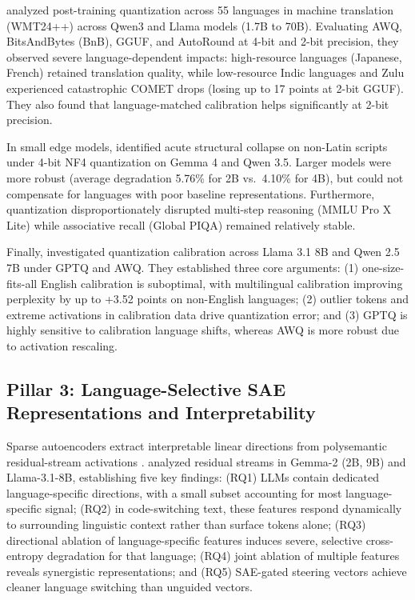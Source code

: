 \documentclass[11pt]{article}
\begin{document}
\citet{marie2025uneven} analyzed post-training quantization across 55 languages in machine translation (WMT24++) across Qwen3 and Llama models (1.7B to 70B). Evaluating AWQ, BitsAndBytes (BnB), GGUF, and AutoRound at 4-bit and 2-bit precision, they observed severe language-dependent impacts: high-resource languages (Japanese, French) retained translation quality, while low-resource Indic languages and Zulu experienced catastrophic COMET drops (losing up to 17 points at 2-bit GGUF). They also found that language-matched calibration helps significantly at 2-bit precision.

In small edge models, \citet{soualhi2026multilingual} identified acute structural collapse on non-Latin scripts under 4-bit NF4 quantization on Gemma 4 and Qwen 3.5. Larger models were more robust (average degradation 5.76\% for 2B vs.\ 4.10\% for 4B), but could not compensate for languages with poor baseline representations. Furthermore, quantization disproportionately disrupted multi-step reasoning (MMLU Pro X Lite) while associative recall (Global PIQA) remained relatively stable.

Finally, \citet{chimoto2026calibrating} investigated quantization calibration across Llama 3.1 8B and Qwen 2.5 7B under GPTQ and AWQ. They established three core arguments: (1) one-size-fits-all English calibration is suboptimal, with multilingual calibration improving perplexity by up to +3.52 points on non-English languages; (2) outlier tokens and extreme activations in calibration data drive quantization error; and (3) GPTQ is highly sensitive to calibration language shifts, whereas AWQ is more robust due to activation rescaling.

\subsection{Pillar 3: Language-Selective SAE Representations and Interpretability}
Sparse autoencoders extract interpretable linear directions from polysemantic residual-stream activations \citep{lieberum2024gemma, he2024llama}. \citet{deng2025unveiling} analyzed residual streams in Gemma-2 (2B, 9B) and Llama-3.1-8B, establishing five key findings: (RQ1) LLMs contain dedicated language-specific directions, with a small subset accounting for most language-specific signal; (RQ2) in code-switching text, these features respond dynamically to surrounding linguistic context rather than surface tokens alone; (RQ3) directional ablation of language-specific features induces severe, selective cross-entropy degradation for that language; (RQ4) joint ablation of multiple features reveals synergistic representations; and (RQ5) SAE-gated steering vectors achieve cleaner language switching than unguided vectors.
\end{document}
